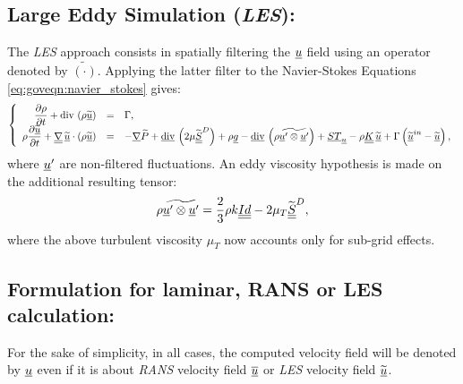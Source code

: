 \subsection{Large Eddy Simulation (\emph{LES}):}
The \emph{LES} approach consists in spatially filtering the $\underline{u}$ field using an operator denoted by $\widetilde{\left(\cdot \right)} $.
Applying the latter filter to the Navier-Stokes Equations \eqref{eq:goveqn:navier_stokes} gives:
%
\begin{equation}\label{eq:goveqn:navier_stokes_les}
\left\lbrace
\begin{array}{r c l}
\dfrac{\partial \rho}{\partial t} + \text{div}\, \left( \rho \widetilde{\underline{u}} \right) &=& \Gamma, \\
\rho \dfrac{\partial  \widetilde{\underline{u}} }{\partial t}
+
\underline{\underline{\nabla}} \, \widetilde{\underline{u}} \cdot \left( \rho \widetilde{\underline{u}}\right)
&=& - \underline{\nabla} \widetilde{P}
+ \underline{\text{div}}\, \left( 2 \mu  \widetilde{\underline{\underline{S}}}^D   \right)
+ \rho \underline{g}
- \underline{\text{div}}\, \left( \rho \widetilde{\underline{u}^\prime \otimes \underline{u}^\prime } \right)
 +\underline{ST}_{\underline{u}}-\rho\underline{\underline{K}}\,\widetilde{\underline{u}} + \Gamma \left( \widetilde{\underline{u}}^{in} - \widetilde{\underline{u}} \right),
\end{array}
\right.
\end{equation}
where $\underline{u}^\prime$ are non-filtered fluctuations. An eddy viscosity hypothesis is made on the additional
resulting tensor:
\begin{equation}
\rho \widetilde{\underline{u}^\prime \otimes \underline{u}^\prime }  = \dfrac{2}{3} \rho k \underline{\underline{Id}} - 2 \mu_T \widetilde{\underline{\underline{S}}}^D,
\end{equation}
%
where the above turbulent viscosity $\mu_T$ now accounts only for sub-grid effects.

\subsection{Formulation for laminar, RANS or LES calculation:}
For the sake of simplicity, in all cases, the computed velocity field will be denoted by $\underline{u}$ even if
it is about \emph{RANS} velocity field $\overline{\underline{u}}$ or \emph{LES} velocity field $\widetilde{\underline{u}}$.

